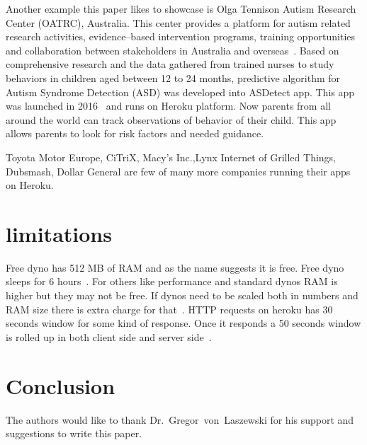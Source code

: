  Another example this paper likes to showcase is Olga Tennison Autism Research
 Center (OATRC), Australia. This center provides a platform for autism related
 research activities, evidence--based intervention programs, training
 opportunities and collaboration between stakeholders in Australia and
 overseas~\cite{www-customers-heroku-com}. Based on comprehensive research and
 the data gathered from trained nurses to study behaviors in children aged 
 between 12 to 24 months, predictive algorithm for Autism Syndrome Detection (ASD)
 was developed into ASDetect app. This app was launched in 
 2016~\cite{www-customers-heroku-com} and runs on Heroku platform. Now parents
 from all around the world can track observations of behavior of their child.
 This app allows parents to look for risk factors and needed guidance.

 Toyota Motor Europe, CiTriX, Macy's Inc.,Lynx Internet of Grilled Things,
 Dubsmash, Dollar General are few of many more companies running their apps
 on Heroku.


\section{limitations}
 Free dyno has 512 MB of RAM and as the name suggests it is free. Free dyno
 sleeps for 6 hours~\cite{www-how-heroku-works}. For others like performance
 and standard dynos RAM is higher but they may not be free. If dynos need to
 be scaled both in numbers and RAM size there is extra charge for
 that~\cite{www-how-heroku-works}. HTTP requests on heroku has 30 seconds
 window for some kind of response. Once it responds a 50 seconds window is
 rolled up in both client side and server side~\cite{www-devcenter-herokulimits}.

\section{Conclusion}


\begin{acks}

  The authors would like to thank Dr.~Gregor~von~Laszewski for his
  support and suggestions to write this paper.

\end{acks}


 


